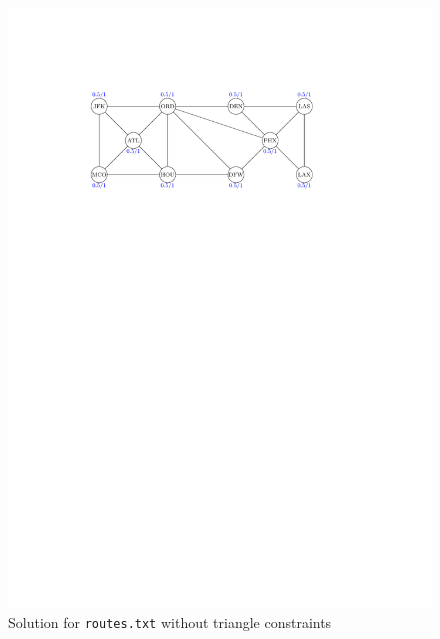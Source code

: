 \documentclass{article}
\begin{document}
\begin{figure}
    \centering
    \includegraphics[page=1]{Assignment4/graphics.pdf}
    \caption{Solution for \lstinline|routes.txt| without triangle constraints}
    \label{fig:routes}
\end{figure}
\end{document}
